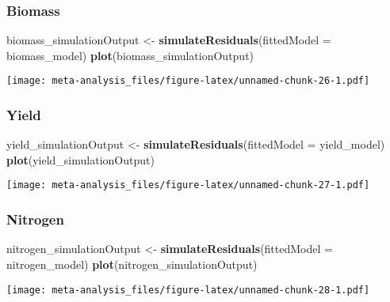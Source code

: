 \documentclass[
]{article}
\newenvironment{Shaded}{\begin{snugshade}}{\end{snugshade}}
\newcommand{\AttributeTok}[1]{\textcolor[rgb]{0.13,0.29,0.53}{#1}}
\newcommand{\FunctionTok}[1]{\textcolor[rgb]{0.13,0.29,0.53}{\textbf{#1}}}
\newcommand{\NormalTok}[1]{#1}
\newcommand{\OtherTok}[1]{\textcolor[rgb]{0.56,0.35,0.01}{#1}}
\begin{document}
\hypertarget{biomass-2}{%
\subsubsection{Biomass}\label{biomass-2}}

\begin{Shaded}
\begin{Highlighting}[]
\NormalTok{biomass\_simulationOutput }\OtherTok{\textless{}{-}} \FunctionTok{simulateResiduals}\NormalTok{(}\AttributeTok{fittedModel =}\NormalTok{ biomass\_model)}
\FunctionTok{plot}\NormalTok{(biomass\_simulationOutput)}
\end{Highlighting}
\end{Shaded}

\texttt{[image: meta-analysis\_files/figure-latex/unnamed-chunk-26-1.pdf]}

\hypertarget{yield-2}{%
\subsubsection{Yield}\label{yield-2}}

\begin{Shaded}
\begin{Highlighting}[]
\NormalTok{yield\_simulationOutput }\OtherTok{\textless{}{-}} \FunctionTok{simulateResiduals}\NormalTok{(}\AttributeTok{fittedModel =}\NormalTok{ yield\_model)}
\FunctionTok{plot}\NormalTok{(yield\_simulationOutput)}
\end{Highlighting}
\end{Shaded}

\texttt{[image: meta-analysis\_files/figure-latex/unnamed-chunk-27-1.pdf]}

\hypertarget{nitrogen-2}{%
\subsubsection{Nitrogen}\label{nitrogen-2}}

\begin{Shaded}
\begin{Highlighting}[]
\NormalTok{nitrogen\_simulationOutput }\OtherTok{\textless{}{-}} \FunctionTok{simulateResiduals}\NormalTok{(}\AttributeTok{fittedModel =}\NormalTok{ nitrogen\_model)}
\FunctionTok{plot}\NormalTok{(nitrogen\_simulationOutput)}
\end{Highlighting}
\end{Shaded}

\texttt{[image: meta-analysis\_files/figure-latex/unnamed-chunk-28-1.pdf]}
\end{document}
